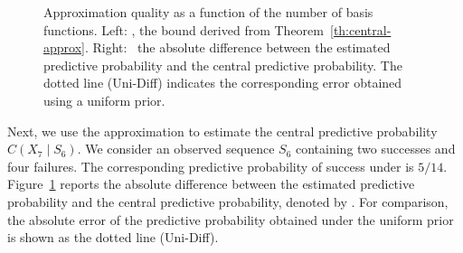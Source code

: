 \begin{figure}[t]
    \centering
    \caption{
        Approximation quality as a function of the number of basis functions.
        Left: \Fdelta, the bound derived from Theorem~\ref{th:central-approx}.
        Right: \PredErr\, the absolute difference between the estimated predictive probability and the
        central predictive probability.
        The dotted line (Uni-Diff) indicates the corresponding error obtained using a uniform prior.
    }
    \label{fig:error_comparision}
\end{figure}


Next, we use the approximation to estimate the central predictive probability $C(X_7\mid S_6)$.
We consider an observed sequence $S_6$ containing two successes and four failures.
The corresponding predictive probability of success under \cDist is $5/14$.
Figure~\ref{fig:error_comparision} reports the absolute difference between the estimated predictive probability and
the central predictive probability, denoted by \PredErr.
For comparison, the absolute error of the predictive probability obtained under the uniform prior is shown as the
dotted line (Uni-Diff).


